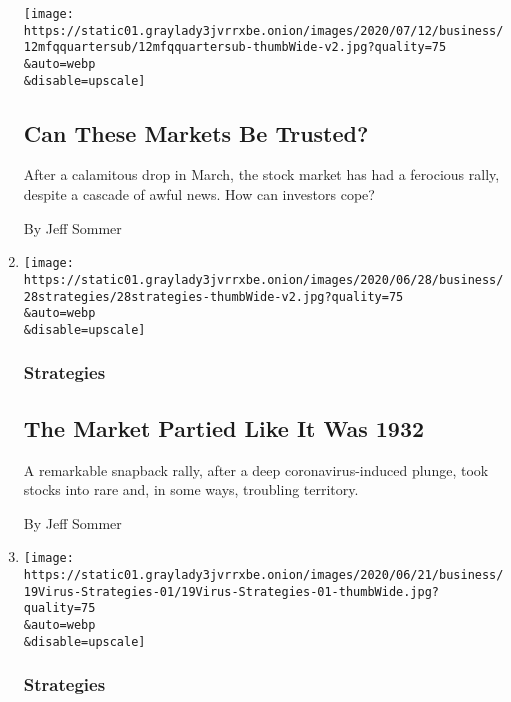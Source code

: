 \begin{enumerate}
  \texttt{[image: https://static01.graylady3jvrrxbe.onion/images/2020/07/12/business/12mfqquartersub/12mfqquartersub-thumbWide-v2.jpg?quality=75\\\&auto=webp\\\&disable=upscale]}

  \hypertarget{can-these-markets-be-trusted}{%
  \subsection{Can These Markets Be
  Trusted?}\label{can-these-markets-be-trusted}}

  After a calamitous drop in March, the stock market has had a ferocious
  rally, despite a cascade of awful news. How can investors cope?

  By Jeff Sommer
\item
  \href{/2020/06/26/business/stock-market-prices-irrational.html}{}

  \texttt{[image: https://static01.graylady3jvrrxbe.onion/images/2020/06/28/business/28strategies/28strategies-thumbWide-v2.jpg?quality=75\\\&auto=webp\\\&disable=upscale]}

  \hypertarget{strategies-4}{%
  \subsubsection{Strategies}\label{strategies-4}}

  \hypertarget{the-market-partied-like-it-was-1932}{%
  \subsection{The Market Partied Like It Was
  1932}\label{the-market-partied-like-it-was-1932}}

  A remarkable snapback rally, after a deep coronavirus-induced plunge,
  took stocks into rare and, in some ways, troubling territory.

  By Jeff Sommer
\item
  \href{/2020/06/17/business/hertz-bankruptcy-stock-sale.html}{}

  \texttt{[image: https://static01.graylady3jvrrxbe.onion/images/2020/06/21/business/19Virus-Strategies-01/19Virus-Strategies-01-thumbWide.jpg?quality=75\\\&auto=webp\\\&disable=upscale]}

  \hypertarget{strategies-5}{%
  \subsubsection{Strategies}\label{strategies-5}}

  \hypertarget{hertz-and-now-for-something-completely-worthless}{%
}
\end{enumerate}
